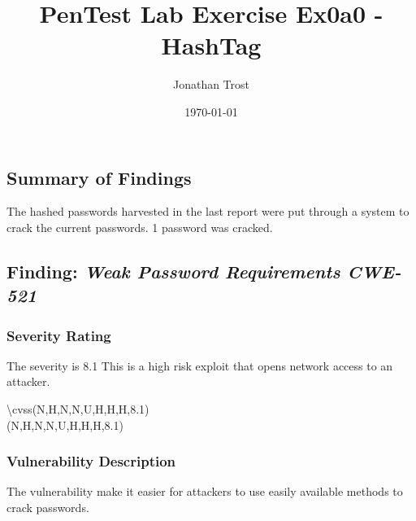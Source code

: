 \documentclass[notitlepage]{article}
\begin{document}
	
	
	\title{PenTest Lab Exercise Ex0a0 - HashTag}
	\author{Jonathan Trost}
	\date{\isodate\today}
	
	\maketitle
	
	\tableofcontents
	
	\newpage
	
	\subsection{Summary of Findings}
	\indent The hashed passwords harvested in the last report were put through a system to crack the current passwords.  1 password was cracked. 
	
	\subsection{Finding: \emph{Weak Password Requirements CWE-521}}
	
	\subsubsection{Severity Rating}
	\indent The severity is 8.1 This is a high risk exploit that opens network access to an attacker. 
	
	\textbackslash cvss(N,H,N,N,U,H,H,H,8.1)\\
	\cvss(N,H,N,N,U,H,H,H,8.1) \\
	
	\subsubsection{Vulnerability Description}
	\indent The vulnerability make it easier for attackers to use easily available methods to crack passwords. 
	
\end{document}
